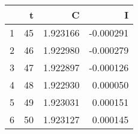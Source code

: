 \begin{table}[ht]
\centering
\begin{tabular}{rrrr}
  \hline
 & t & C & I \\ 
  \hline
1 &      45 & 1.923166 & -0.000291 \\ 
  2 &      46 & 1.922980 & -0.000279 \\ 
  3 &      47 & 1.922897 & -0.000126 \\ 
  4 &      48 & 1.922930 & 0.000050 \\ 
  5 &      49 & 1.923031 & 0.000151 \\ 
  6 &      50 & 1.923127 & 0.000145 \\ 
   \hline
\end{tabular}
\end{table}
